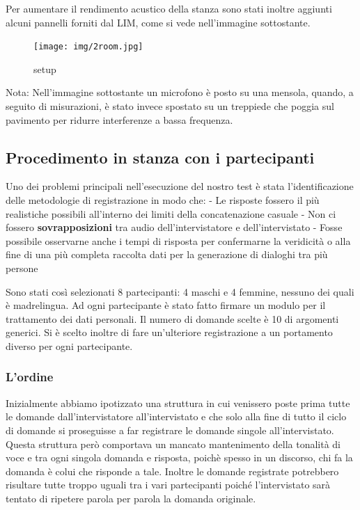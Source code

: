 \documentclass[
]{article}
\begin{document}
Per aumentare il rendimento acustico della stanza sono stati inoltre aggiunti alcuni pannelli forniti dal LIM, come si vede nell'immagine sottostante.

\begin{figure}
\centering
\texttt{[image: img/2room.jpg]}
\caption{setup}
\end{figure}

Nota: Nell'immagine sottostante un microfono è posto su una mensola, quando, a seguito di misurazioni, è stato invece spostato su un treppiede che poggia sul pavimento per ridurre interferenze a bassa frequenza.

\subsection{Procedimento in stanza con i partecipanti}\label{procedimento-in-stanza-con-i-partecipanti}

Uno dei problemi principali nell'esecuzione del nostro test è stata l'identificazione delle metodologie di registrazione in modo che: - Le risposte fossero il più realistiche possibili all'interno dei limiti della concatenazione casuale - Non ci fossero \textbf{sovrapposizioni} tra audio dell'intervistatore e dell'intervistato - Fosse possibile osservarne anche i tempi di risposta per confermarne la veridicità o alla fine di una più completa raccolta dati per la generazione di dialoghi tra più persone

Sono stati così selezionati 8 partecipanti: 4 maschi e 4 femmine, nessuno dei quali è madrelingua. Ad ogni partecipante è stato fatto firmare un modulo per il trattamento dei dati personali. Il numero di domande scelte è 10 di argomenti generici. Si è scelto inoltre di fare un'ulteriore registrazione a un portamento diverso per ogni partecipante.

\subsubsection{L'ordine}\label{lordine}

Inizialmente abbiamo ipotizzato una struttura in cui venissero poste prima tutte le domande dall'intervistatore all'intervistato e che solo alla fine di tutto il ciclo di domande si proseguisse a far registrare le domande singole all'intervistato. Questa struttura però comportava un mancato mantenimento della tonalità di voce e tra ogni singola domanda e risposta, poichè spesso in un discorso, chi fa la domanda è colui che risponde a tale. Inoltre le domande registrate potrebbero risultare tutte troppo uguali tra i vari partecipanti poiché l'intervistato sarà tentato di ripetere parola per parola la domanda originale.
\end{document}
